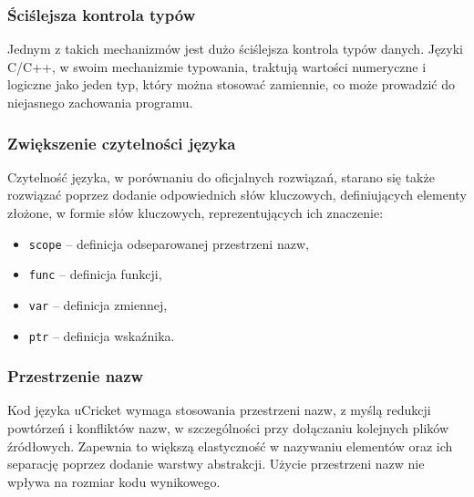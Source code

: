 \subsubsection{Ściślejsza kontrola typów}
Jednym z takich mechanizmów jest dużo ściślejsza kontrola typów danych. Języki C/C++, w swoim  mechanizmie typowania, traktują wartości numeryczne i logiczne jako jeden typ, który można stosować zamiennie, co może prowadzić do niejasnego zachowania programu. 
\subsubsection{Zwiększenie czytelności języka}
Czytelność języka, w porównaniu do oficjalnych rozwiązań, starano się także rozwiązać poprzez dodanie odpowiednich słów kluczowych, definiujących elementy złożone, w formie słów kluczowych, reprezentujących ich znaczenie:
\begin{itemize}
\item \lstinline|scope| -- definicja odseparowanej przestrzeni nazw,
\item \lstinline|func| -- definicja funkcji,
\item \lstinline|var| -- definicja zmiennej,
\item \lstinline|ptr| -- definicja wskaźnika.
\end{itemize}
\subsubsection{Przestrzenie nazw}
Kod języka uCricket wymaga stosowania przestrzeni nazw, z myślą redukcji powtórzeń i konfliktów nazw, w szczególności przy dołączaniu kolejnych plików źródłowych. Zapewnia to większą elastyczność w nazywaniu elementów oraz ich separację poprzez dodanie warstwy abstrakcji. Użycie przestrzeni nazw nie wpływa na rozmiar kodu wynikowego.


